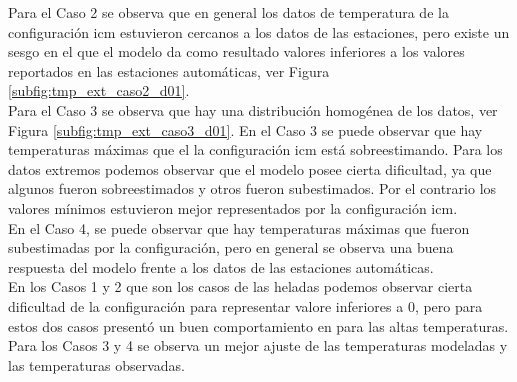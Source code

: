 Para el Caso 2 se observa que en general los datos de temperatura de la configuración icm estuvieron cercanos a los datos de las estaciones, pero existe un sesgo en el que el modelo da como resultado valores inferiores a los valores reportados en las estaciones automáticas, ver Figura \ref{subfig:tmp_ext_caso2_d01}.\\

Para el Caso 3 se observa que hay una distribución homogénea de los datos, ver Figura \ref{subfig:tmp_ext_caso3_d01}. En el Caso 3 se puede observar que hay temperaturas máximas que el la configuración icm está sobreestimando. Para los datos extremos podemos observar que el modelo posee cierta dificultad, ya que algunos fueron sobreestimados y otros fueron subestimados. Por el contrario los valores mínimos estuvieron mejor representados por la configuración icm.\\

En el Caso 4, se  puede observar que hay temperaturas máximas que fueron subestimadas por la configuración, pero en general se observa una buena respuesta del modelo frente a los datos de las estaciones automáticas.\\

En los Casos 1 y 2 que son los casos de las heladas podemos observar cierta dificultad de la configuración para representar valore inferiores a 0\celsius, pero para estos dos casos presentó un buen comportamiento en para las altas temperaturas. Para los Casos 3 y 4 se observa un mejor ajuste de las temperaturas modeladas y las temperaturas observadas.\\



